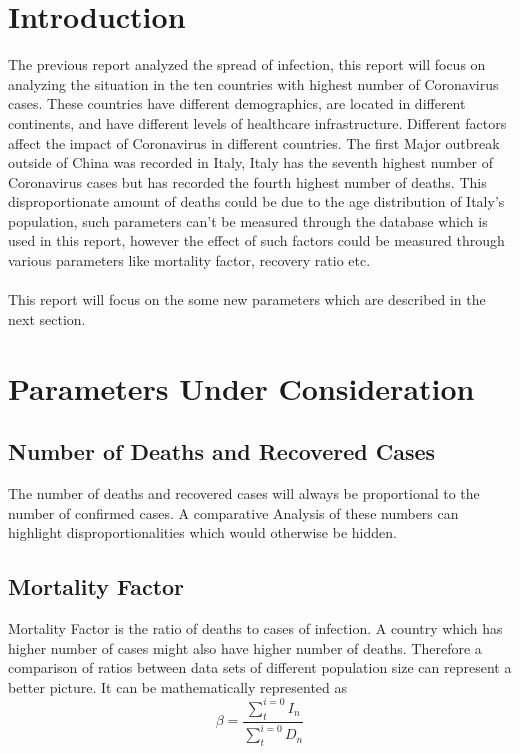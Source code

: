 \documentclass[12pt, twosided]{report}  %
\begin{document}
\section{Introduction}
The previous report analyzed the spread of infection, this report will focus on analyzing the situation in the ten countries with highest number of Coronavirus cases. These countries have different demographics, are located in different continents, and have different levels of healthcare infrastructure. Different factors affect the impact of Coronavirus in different countries. The first Major outbreak outside of China was recorded in Italy, Italy has the seventh highest number of Coronavirus cases but has recorded the fourth highest number of deaths. This disproportionate amount of deaths could be due to the age distribution of Italy's population, such parameters can't be measured through the database which is used in this report, however the effect of such factors could be measured through various parameters like mortality factor, recovery ratio etc.
\\
\\
This report will focus on the some new parameters which are described in the next section.

\section{Parameters Under Consideration}
\subsection*{Number of Deaths and Recovered Cases}
The number of deaths and recovered cases will always be proportional to the number of confirmed cases. A comparative Analysis of these numbers can highlight disproportionalities which would otherwise be hidden.
\subsection*{Mortality Factor}
Mortality Factor is the ratio of deaths to cases of infection. A country which has higher number of cases might also have higher number of deaths. Therefore a comparison of ratios between data sets of different population size can represent a better picture. It can be mathematically represented as
$$\beta=\frac{\sum^{i=0}_{t} I_n}{\sum^{i=0}_{t} D_n}$$
\end{document}
